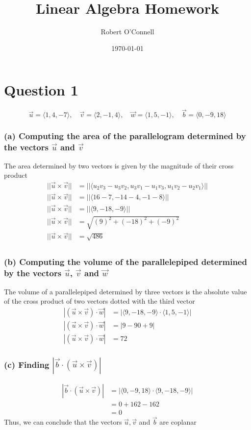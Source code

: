 \documentclass{article}
\title{\textbf{Linear Algebra Homework }}
\author{Robert O'Connell}
\date{\today}
\begin{document}
\maketitle
\vspace{5mm}
\section*{Question 1}
\[
\vec{u} = \langle 1,4,-7 \rangle, \quad \vec{v} = \langle 2,-1,4 \rangle, \quad \vec{w} = \langle 1,5,-1 \rangle, \quad \vec{b} = \langle 0,-9,18 \rangle
\]
\subsubsection*{(a) Computing the area of the parallelogram determined by the vectors \(\vec{u}\) and \(\vec{v}\)}
The area determined by two vectors is given by the magnitude of their cross product
\begin{align*}
    ||\vec{u} \times \vec{v}|| &= ||\langle u_2v_3 - u_3v_2, u_3v_1 - u_1v_3, u_1v_2 - u_2v_1 \rangle|| \\
    ||\vec{u} \times \vec{v}|| &= ||\langle 16 - 7, -14 - 4, -1 -8 \rangle||\\
    ||\vec{u} \times \vec{v}|| &= ||\langle 9, -18, -9 \rangle||\\
    ||\vec{u} \times \vec{v}|| &= \sqrt{(9)^2 + (-18)^2 + (-9)^2}\\
    ||\vec{u} \times \vec{v}|| &= \sqrt{486}\\
\end{align*}

\subsubsection*{(b) Computing the volume of the parallelepiped determined by the vectors \(\vec{u}\), \(\vec{v}\) and \(\vec{w}\)}
The volume of a parallelepiped determined by three vectors is the absolute value of the cross product of two vectors dotted with the third vector
\begin{align*}
    |(\vec{u} \times \vec{v}) \cdot \vec{w}| &= |\langle 9, -18, -9 \rangle \cdot \langle 1,5,-1 \rangle | \\
    |(\vec{u} \times \vec{v}) \cdot \vec{w}| &= | 9 - 90 + 9| \\
    |(\vec{u} \times \vec{v}) \cdot \vec{w}| &= 72 
\end{align*}

\subsubsection*{(c) Finding     \(|\vec{b} \cdot (\vec{u} \times \vec{v})|\)}
\begin{align*}
    |\vec{b} \cdot (\vec{u} \times \vec{v})| &= |\langle 0,-9,18 \rangle \cdot \langle 9, -18, -9 \rangle| \\
    &= 0 + 162 - 162 \\
    &= 0
\end{align*}
Thus, we can conclude that the vectors \(\vec{u}, \vec{v}\) and \(\vec{b}\) are coplanar
\end{document}
